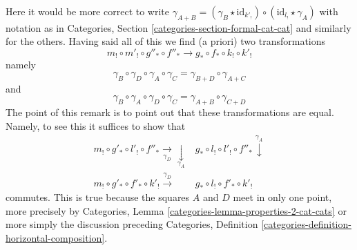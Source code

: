 \begin{remark}
$$$$
Here it would be more correct to write
$\gamma_{A + B} = (\gamma_B \star \text{id}_{k'_!}) \circ
(\text{id}_{l_!} \star \gamma_A)$ with notation as in
Categories, Section \ref{categories-section-formal-cat-cat}
and similarly for the others.
Having said all of this we find (a priori) two transformations
$$
m_! \circ m'_! \circ g''_* \circ f''_*
\longrightarrow
g_* \circ f_* \circ k_! \circ k'_!
$$
namely
$$
\gamma_B \circ \gamma_D \circ \gamma_A \circ \gamma_C =
\gamma_{B + D} \circ \gamma_{A + C}
$$
and
$$
\gamma_B \circ \gamma_A \circ \gamma_D \circ \gamma_C =
\gamma_{A + B} \circ \gamma_{C + D}
$$
The point of this remark is to point out that these transformations
are equal. Namely, to see this it suffices to show that
$$
\begin{array}{cc}m_! \circ g'_* \circ l'_! \circ f''_* \underset{\gamma_D}{\longrightarrow}\underset{\gamma_A}{\downarrow} & g_* \circ l_! \circ l'_! \circ f''_* \overset{\gamma_A}{\downarrow} \\ m_! \circ g'_* \circ f'_* \circ k'_! \overset{\gamma_D}{\longrightarrow} & g_* \circ l_! \circ f'_* \circ k'_!\end{array}
$$
commutes. This is true because the squares $A$ and $D$ meet in only
one point, more precisely by
Categories, Lemma \ref{categories-lemma-properties-2-cat-cats}
or more simply the discussion preceding
Categories, Definition \ref{categories-definition-horizontal-composition}.
\end{remark}

